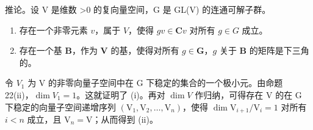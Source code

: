推论。设 V 是维数 \textgreater0 的复向量空间，G 是 GL(V) 的连通可解子群。

\begin{enumerate}
\def\labelenumi{(\roman{enumi})}
\item
  存在一个非零元素 \(v\)，属于 \(V\)，使得 \(gv \in \mathbf{C}v\) 对所有 \(g \in G\) 成立。
\item
  存在一个基 \(\mathbf{B}\)，作为 \(\mathbf{V}\) 的基，使得对所有 \(g \in \mathbf{G}\)，\(g\) 关于 \(\mathbf{B}\) 的矩阵是下三角的。
\end{enumerate}

令 \(V_{1}\) 为 V 的非零向量子空间中在 G 下稳定的集合的一个极小元。由命题 22(ii)，\(\dim V_{1} = 1\)。这就证明了 (i)。再对 \(\dim V\) 作归纳，可得存在 V 的在 G 下稳定的向量子空间递增序列 \((\mathrm{V}_1, \mathrm{V}_2, \ldots, \mathrm{V}_n)\)，使得 \(\dim \mathrm{V}_{i+1} / \mathrm{V}_i = 1\) 对所有 \(i < n\) 成立，且 \(\mathrm{V}_n = \mathrm{V}\)；从而得到 (ii)。


